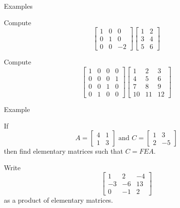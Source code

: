 \documentclass{beamer}
\begin{document}
\begin{frame}{Examples}
  \begin{example}
    Compute
    \begin{equation*}
      \left[
	\begin{array}{ccc}
          1&0&0\\
          0&1&0\\
          0&0&-2
	\end{array}
      \right]
      \left[
	\begin{array}{cc}
          1&2\\
          3&4\\
          5&6
	\end{array}
      \right]
    \end{equation*}
  \end{example}
  \begin{example}
    Compute
    \begin{equation*}
      \left[
	\begin{array}{cccc}
          1&0&0&0\\
          0&0&0&1\\
          0&0&1&0\\
          0&1&0&0
	\end{array}
      \right]
      \left[
	\begin{array}{ccc}
          1&2&3\\
          4&5&6\\
          7&8&9\\
          10&11&12
	\end{array}
      \right]
    \end{equation*}
  \end{example}
\end{frame}

\begin{frame}{Example}
  \begin{example}
    If
    \begin{equation*}
      A = \left[
        \begin{array}{cc}
          4&1\\
          1&3
        \end{array}
      \right]\text{ and }
      C= \left[
        \begin{array}{cc}
          1&3\\
          2&-5
        \end{array}
      \right]
    \end{equation*}
    then find elementary matrices such that $C = FEA$.
  \end{example}
  \begin{example}
    Write
    \begin{equation*}
      \left[
	\begin{array}{ccc}
          1&2&-4\\
          -3&-6&13\\
          0&-1&2
	\end{array}
      \right]
    \end{equation*}
    as a product of elementary matrices.
  \end{example}
\end{frame}
\end{document}
